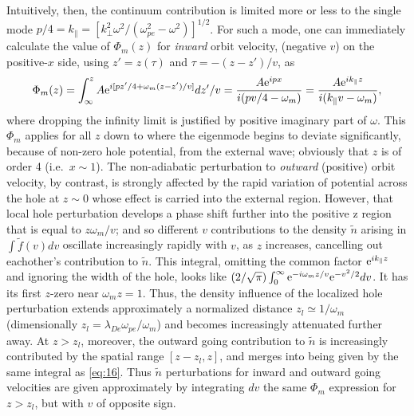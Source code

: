 \documentclass[12pt]{article}
\def\etothe#1{{\rm e}^{#1}}
\begin{document}
Intuitively, then, the continuum contribution is limited more or less
to the single mode
$p/4=k_\parallel= [k_\perp^2\omega^2/(\omega_{pe}^2-\omega^2)]^{1/2}$.
For such a mode, one can immediately calculate the value of
$\Phi_m(z)$ for \emph{inward} orbit velocity, (negative $v$) on the
positive-$x$ side, using $z'=z(\tau)$ and $\tau=-(z-z')/v$, as
\begin{equation}
  \label{eq:16}
  \Phi_m(z) = \int_{\infty}^zA{\rm e}^{i[pz'/4+\omega_m
    (z-z')/v]}dz'/v
  ={A{\rm e}^{ipx} \over i(pv/4-\omega_m)}={A{\rm e}^{ik_\parallel z} \over
    i(k_\parallel v-\omega_m)},
\end{equation}
where dropping the infinity limit is justified by positive imaginary
part of $\omega$.  This $\Phi_m$ applies for all $z$ down to where the
eigenmode begins to deviate significantly, because of non-zero hole
potential, from the external wave; obviously that $z$ is of order 4
(i.e.\ $x\sim 1$). The non-adiabatic perturbation to \emph{outward}
(positive) orbit velocity, by contrast, is strongly affected by the
rapid variation of potential across the hole at $z\sim 0$ whose effect
is carried into the external region. However,
that local hole perturbation develops a phase shift further into the
positive z region that is equal to $z\omega_m/v$; and so different $v$
contributions to the density $\tilde n$ arising in
$\int \tilde f(v) dv$ oscillate increasingly rapidly with $v$, as $z$
increases, cancelling out eachother's contribution to $\tilde n$. This
integral, omitting the common factor $\etothe{ik_\parallel z}$ and
ignoring the width of the hole, looks like
$(2/\sqrt{\pi})\int_0^\infty \etothe{-i\omega_m
  z/v}\etothe{-v^2/2}dv$.  It has its first $z$-zero near
$\omega_m z=1$. Thus, the density influence of the localized hole
perturbation extends approximately a normalized distance
$z_l\simeq 1/\omega_m$ (dimensionally
$z_l= \lambda_{De}\omega_{pe}/\omega_m$) and becomes increasingly
attenuated further away. At $z>z_l$, moreover, the outward going
contribution to $\tilde n$ is increasingly contributed by the spatial
range $[z-z_l,z]$, and merges into being given by the same integral as
\ref{eq:16}.  Thus $\tilde n$ perturbations for inward and outward
going velocities are given approximately by integrating $dv$ the
same $\Phi_m$ expression for $z>z_l$, but with $v$ of opposite sign.
\end{document}
